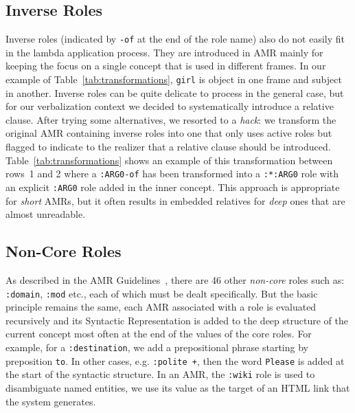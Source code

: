\documentclass[12pt]{article}
\newcommand{\representation}[1]{\textsf{#1}}
\newcommand{\AMR}{\representation{AMR}}
\newcommand{\syntr}{\representation{Syntactic Representation}}
\begin{document}
\subsection{Inverse Roles} %
\label{sub:inverse_roles}
Inverse roles (indicated by \texttt{-of} at the end of the role name) also do not easily fit in the lambda application process. They are introduced in \AMR{} mainly for keeping the focus on a single concept that is used in different frames. In our example of Table~\ref{tab:transformations}, \texttt{girl} is object in one frame and subject in another. Inverse roles can be quite delicate to process in the general case, but for our verbalization context we decided to systematically introduce a relative clause. After trying some alternatives, we resorted to a \emph{hack}: we transform the original \AMR{} containing inverse roles into one that only uses active roles but flagged to indicate to the realizer that a relative clause should be introduced. Table~\ref{tab:transformations} shows an example of this transformation between rows~1 and 2 where a \texttt{:ARG0-of} has been transformed into a \texttt{:*:ARG0} role with an explicit \texttt{:ARG0} role added in the inner concept. This approach is appropriate for \emph{short} \AMR{}s, but it often results in embedded relatives for \emph{deep} ones that are almost unreadable.


\subsection{Non-Core Roles} %
\label{sub:non_core_roles}
As described in the AMR Guidelines~\cite{AMR-Guidelines}, there are 46 other \emph{non-core} roles such as: \texttt{:domain}, \texttt{:mod} etc., each of which must be dealt specifically. But the basic principle remains the same, each AMR associated with a role is evaluated recursively and its \syntr{} is added to the deep structure of the current concept most often at the end of the values of the core roles. For example, for a \texttt{:destination}, we add a prepositional phrase starting by preposition \texttt{to}.  In other cases, e.g. \texttt{:polite +}, then the word \texttt{Please} is added at the start of the syntactic structure. In an AMR, the \texttt{:wiki} role is used to disambiguate named entities, we use its value as the target of an HTML link that the system generates.

\end{document}
